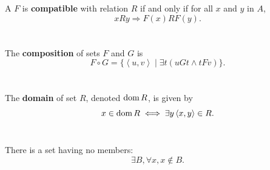 \documentclass{report}
\begin{document}
A  $F$ is \textbf{compatible} with relation $R$ if and
  only if for all $x$ and $y$ in $A$,
  $$xRy \Rightarrow F(x)RF(y).$$

\begin{definition}


\end{definition}

\section{}%
\label{ref:composition}

The \textbf{composition} of sets $F$ and $G$ is
  $$F \circ G = \{\left< u, v \right> \mid \exists t(uGt \land tFv)\}.$$

\begin{definition}


\end{definition}

\section{}%
\label{ref:domain}

The \textbf{domain} of set $R$, denoted $\mathop{\text{dom}}{R}$, is given by
  $$x \in \mathop{\text{dom}}{R} \iff \exists y \left< x, y \right> \in R.$$

\begin{definition}


\end{definition}

\section{}%
\label{ref:empty-set-axiom}

There is a set having no members:
  $$\exists B, \forall x, x \not\in B.$$

\begin{axiom}


\end{axiom}

\section{}%
\label{ref:equivalence-relation}
\end{document}

